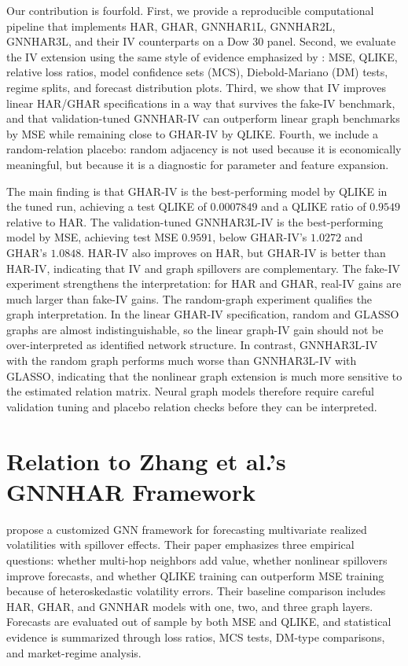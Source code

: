 \documentclass[11pt,a4paper]{article}
\begin{document}
Our contribution is fourfold. First, we provide a reproducible computational pipeline
that implements HAR, GHAR, GNNHAR1L, GNNHAR2L, GNNHAR3L, and their IV counterparts
on a Dow 30 panel. Second, we evaluate the IV extension using the same style of evidence
emphasized by \citet{zhang2025gnnhar}: MSE, QLIKE, relative loss ratios, model confidence
sets (MCS), Diebold-Mariano (DM) tests, regime splits, and forecast distribution plots. Third,
we show that IV improves linear HAR/GHAR specifications in a way that survives the fake-IV
benchmark, and that validation-tuned GNNHAR-IV can outperform linear graph benchmarks by
MSE while remaining close to GHAR-IV by QLIKE. Fourth, we include a random-relation
placebo: random adjacency is not used because it is economically meaningful, but because it is
a diagnostic for parameter and feature expansion.

The main finding is that GHAR-IV is the best-performing model by QLIKE in the tuned run,
achieving a test QLIKE of \(0.0007849\) and a QLIKE ratio of \(0.9549\) relative to HAR.
The validation-tuned GNNHAR3L-IV is the best-performing model by MSE, achieving test MSE
\(0.9591\), below GHAR-IV's \(1.0272\) and GHAR's \(1.0848\). HAR-IV also improves on
HAR, but GHAR-IV is better than HAR-IV, indicating that IV and graph spillovers are
complementary. The fake-IV experiment strengthens the interpretation: for HAR and GHAR,
real-IV gains are much larger than fake-IV gains. The random-graph experiment qualifies the
graph interpretation. In the linear GHAR-IV specification, random and GLASSO graphs are
almost indistinguishable, so the linear graph-IV gain should not be over-interpreted as
identified network structure. In contrast, GNNHAR3L-IV with the random graph performs much
worse than GNNHAR3L-IV with GLASSO, indicating that the nonlinear graph extension is much
more sensitive to the estimated relation matrix. Neural graph models therefore require careful
validation tuning and placebo relation checks before they can be interpreted.

\section{Relation to Zhang et al.'s GNNHAR Framework}

\citet{zhang2025gnnhar} propose a customized GNN framework for forecasting multivariate
realized volatilities with spillover effects. Their paper emphasizes three empirical questions:
whether multi-hop neighbors add value, whether nonlinear spillovers improve forecasts, and
whether QLIKE training can outperform MSE training because of heteroskedastic volatility
errors. Their baseline comparison includes HAR, GHAR, and GNNHAR models with one, two,
and three graph layers. Forecasts are evaluated out of sample by both MSE and QLIKE, and
statistical evidence is summarized through loss ratios, MCS tests, DM-type comparisons, and
market-regime analysis.
\end{document}
